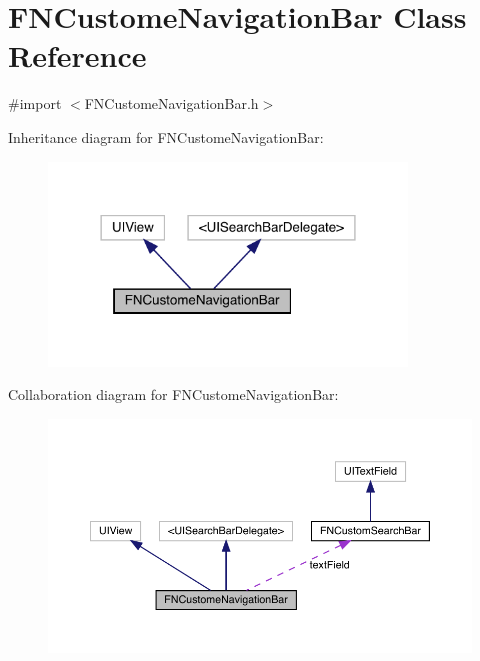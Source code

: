 \hypertarget{interface_f_n_custome_navigation_bar}{}\section{F\+N\+Custome\+Navigation\+Bar Class Reference}
\label{interface_f_n_custome_navigation_bar}


{\ttfamily \#import $<$F\+N\+Custome\+Navigation\+Bar.\+h$>$}



Inheritance diagram for F\+N\+Custome\+Navigation\+Bar\+:\nopagebreak
\begin{figure}[H]
\begin{center}
\leavevmode
\includegraphics[width=270pt]{interface_f_n_custome_navigation_bar__inherit__graph}
\end{center}
\end{figure}


Collaboration diagram for F\+N\+Custome\+Navigation\+Bar\+:\nopagebreak
\begin{figure}[H]
\begin{center}
\leavevmode
\includegraphics[width=350pt]{interface_f_n_custome_navigation_bar__coll__graph}
\end{center}
\end{figure}
